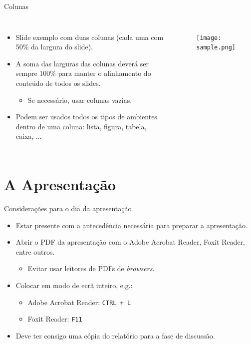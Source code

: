 \documentclass[
aspectratio=169,	%
LETI,				%
english,			%
]{DEEclassP}
\begin{document}
\begin{frame}{Colunas}

\setlstep{0.3cm}{0cm}{0cm}
\begin{columns}
  	\begin{itemize}
  	  	\item Slide exemplo com duas colunas (cada uma com 50\% da largura do slide).
  		\item A soma das larguras das colunas deverá ser sempre 100\% para manter o alinhamento do conteúdo de todos os slides.
  		\begin{itemize}
  			\item Se necessário, usar colunas vazias.
  		\end{itemize}
  		\item Podem ser usados todos os tipos de ambientes dentro de uma coluna: lista, figura, tabela, caixa, $\ldots$
	\end{itemize}
 
\begin{figure}[h]						
	\centering							
	\texttt{[image: sample.png]}
\end{figure}
\end{columns}

\end{frame}

\section{A Apresentação}
\begin{frame}[fragile]{Considerações para o dia da apresentação}

\setlstep{0.3cm}{0cm}{0cm}
\begin{itemize}
	\item Estar presente com a antecedência necessária para preparar a apresentação.
	\item Abrir o PDF da apresentação com o Adobe Acrobat Reader, Foxit Reader, entre outros.
	\begin{itemize}
		\item Evitar usar leitores de PDFs de \textit{browsers}.
	\end{itemize} 
	\item Colocar em modo de ecrã inteiro, e.g.:
	\begin{itemize}
		\item Adobe Acrobat Reader: \verb|CTRL + L|
		\item Foxit Reader: \verb|F11|
	\end{itemize}	
	\item Deve ter consigo uma cópia do relatório para a fase de discussão.
\end{itemize}
	
\end{frame}
\end{document}
